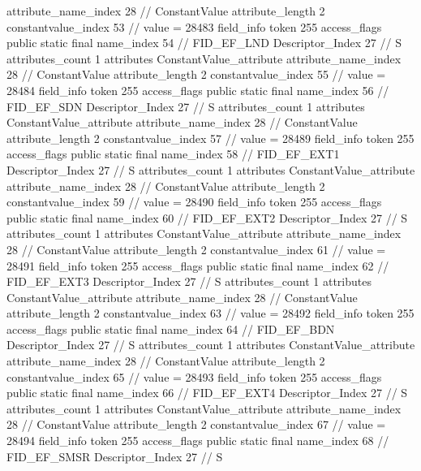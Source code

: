 {{{{{{{					attribute_name_index	28		// ConstantValue
					attribute_length	2
					constantvalue_index	53		// value = 28483
				}
				}
			}
			field_info {
				token	255
				access_flags	public static final
				name_index	54		// FID_EF_LND
				Descriptor_Index	27		// S
				attributes_count	1
				attributes {
				ConstantValue_attribute {
					attribute_name_index	28		// ConstantValue
					attribute_length	2
					constantvalue_index	55		// value = 28484
				}
				}
			}
			field_info {
				token	255
				access_flags	public static final
				name_index	56		// FID_EF_SDN
				Descriptor_Index	27		// S
				attributes_count	1
				attributes {
				ConstantValue_attribute {
					attribute_name_index	28		// ConstantValue
					attribute_length	2
					constantvalue_index	57		// value = 28489
				}
				}
			}
			field_info {
				token	255
				access_flags	public static final
				name_index	58		// FID_EF_EXT1
				Descriptor_Index	27		// S
				attributes_count	1
				attributes {
				ConstantValue_attribute {
					attribute_name_index	28		// ConstantValue
					attribute_length	2
					constantvalue_index	59		// value = 28490
				}
				}
			}
			field_info {
				token	255
				access_flags	public static final
				name_index	60		// FID_EF_EXT2
				Descriptor_Index	27		// S
				attributes_count	1
				attributes {
				ConstantValue_attribute {
					attribute_name_index	28		// ConstantValue
					attribute_length	2
					constantvalue_index	61		// value = 28491
				}
				}
			}
			field_info {
				token	255
				access_flags	public static final
				name_index	62		// FID_EF_EXT3
				Descriptor_Index	27		// S
				attributes_count	1
				attributes {
				ConstantValue_attribute {
					attribute_name_index	28		// ConstantValue
					attribute_length	2
					constantvalue_index	63		// value = 28492
				}
				}
			}
			field_info {
				token	255
				access_flags	public static final
				name_index	64		// FID_EF_BDN
				Descriptor_Index	27		// S
				attributes_count	1
				attributes {
				ConstantValue_attribute {
					attribute_name_index	28		// ConstantValue
					attribute_length	2
					constantvalue_index	65		// value = 28493
				}
				}
			}
			field_info {
				token	255
				access_flags	public static final
				name_index	66		// FID_EF_EXT4
				Descriptor_Index	27		// S
				attributes_count	1
				attributes {
				ConstantValue_attribute {
					attribute_name_index	28		// ConstantValue
					attribute_length	2
					constantvalue_index	67		// value = 28494
				}
				}
			}
			field_info {
				token	255
				access_flags	public static final
				name_index	68		// FID_EF_SMSR
				Descriptor_Index	27		// S
}}}}}
